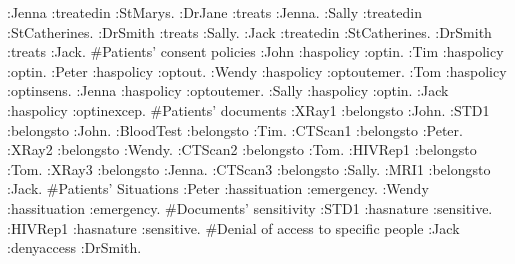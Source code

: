 \documentclass[conference]{IEEEtran}
\begin{document}
:Jenna :treatedin :StMarys.\newline
:DrJane :treats :Jenna.\newline
:Sally :treatedin :StCatherines.\newline
:DrSmith :treats :Sally.\newline
:Jack :treatedin :StCatherines.\newline
:DrSmith :treats :Jack.\newline
\newline
\#Patients' consent policies\newline
:John :haspolicy :optin.\newline
:Tim :haspolicy :optin.\newline
:Peter :haspolicy :optout.\newline
:Wendy :haspolicy :optoutemer.\newline
:Tom :haspolicy :optinsens.\newline
:Jenna :haspolicy :optoutemer.\newline
:Sally :haspolicy :optin.\newline
:Jack :haspolicy :optinexcep.\newline
\newline
\#Patients' documents\newline
:XRay1 :belongsto :John.\newline
:STD1 :belongsto :John.\newline
:BloodTest :belongsto :Tim.\newline
:CTScan1 :belongsto :Peter.\newline
:XRay2 :belongsto :Wendy.\newline
:CTScan2 :belongsto :Tom.\newline
:HIVRep1 :belongsto :Tom.\newline
:XRay3 :belongsto :Jenna.\newline
:CTScan3 :belongsto :Sally.\newline
:MRI1 :belongsto :Jack.\newline
\newline
\#Patients' Situations\newline
:Peter :hassituation :emergency.\newline
:Wendy :hassituation :emergency.\newline
\newline
\#Documents' sensitivity\newline
:STD1 :hasnature :sensitive.\newline
:HIVRep1 :hasnature :sensitive.\newline
 \newline
\#Denial of access to specific people\newline
:Jack :denyaccess :DrSmith.\newline
\end{document}
